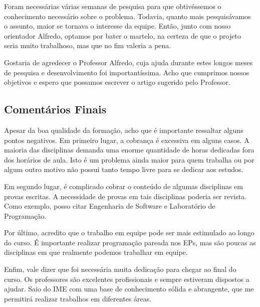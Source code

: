 Foram necessárias várias semanas de pesquisa para que obtivéssemos o conhecimento necessário sobre o
problema. Todavia, quanto mais pesquisávamos o assunto, maior se tornava o interesse da equipe.
Então, junto com nosso orientador Alfredo, optamos por bater o martelo, na certeza de que o projeto
seria muito trabalhoso, mas que no fim valeria a pena.

Gostaria de agredecer o Professor Alfredo, cuja ajuda durante estes longos meses de pesquisa e
desenvolvimento foi importantíssima. Acho que cumprimos nossos objetivos e espero que possamos
escrever o artigo sugerido pelo Professor.

\subsection{Comentários Finais}

Apesar da boa qualidade da formação, acho que é importante ressaltar alguns pontos negativos. Em
primeiro lugar, a cobrança é excessiva em alguns casos. A maioria das disciplinas demanda uma
enorme quantidade de horas dedicadas fora dos horários de aula. Isto é um problema ainda maior para
quem trabalha ou por algum outro motivo não possui tanto tempo livre para se dedicar aos estudos.

Em segundo lugar, é complicado cobrar o conteúdo de algumas disciplinas em provas escritas. A
necessidade de provas em tais disciplinas poderia ser revista. Como exemplo, posso citar Engenharia
de Software e Laboratório de Programação.

Por último, acredito que o trabalho em equipe pode ser mais estimulado ao longo do curso. É
importante realizar programação pareada nos EPs, mas são poucas as disciplinas em que
realmente podemos trabalhar em equipe.

Enfim, vale dizer que foi necessária muita dedicação para chegar ao final do curso. Os professores
são excelentes profissionais e sempre estiveram dispostos a ajudar. Saio do IME com uma base de
conhecimento sólida e abrangente, que me permitirá realizar trabalhos em diferentes áreas.


